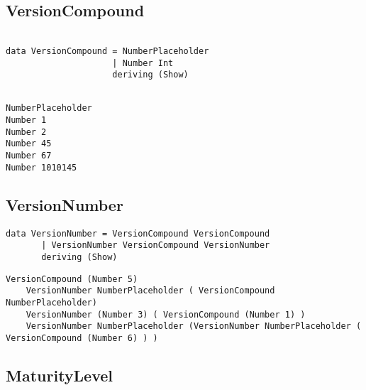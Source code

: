 \documentclass[11pt]{article}
\begin{document}
\subsection{VersionCompound}


\begin{lstlisting}[caption=Haskell]  % Start your code-block

data VersionCompound = NumberPlaceholder
                     | Number Int 
                     deriving (Show)
\end{lstlisting}
\begin{lstlisting}[caption=Examples,style=Examples]  % Start your code-block

NumberPlaceholder	
Number 1	
Number 2	
Number 45	
Number 67	
Number 1010145
\end{lstlisting}

\subsection{VersionNumber}


\begin{lstlisting}[style=Haskell]
data VersionNumber = VersionCompound VersionCompound
       | VersionNumber VersionCompound VersionNumber
       deriving (Show)
\end{lstlisting}

	\begin{lstlisting}[style=Examples]
	VersionCompound (Number 5)
	VersionNumber NumberPlaceholder ( VersionCompound NumberPlaceholder) 
	VersionNumber (Number 3) ( VersionCompound (Number 1) )
	VersionNumber NumberPlaceholder (VersionNumber NumberPlaceholder ( VersionCompound (Number 6) ) )	
	\end{lstlisting}

\subsection{MaturityLevel}
\end{document}
